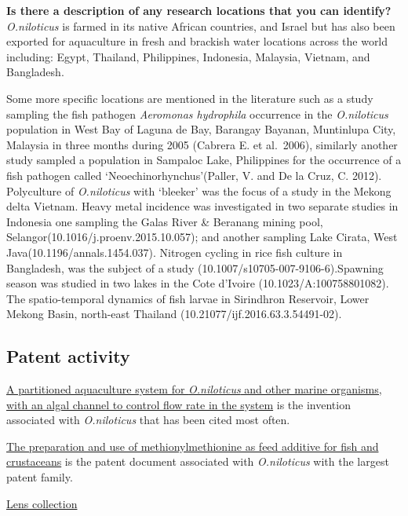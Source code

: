 \documentclass[]{book}
\theoremstyle{definition}
\theoremstyle{definition}
\theoremstyle{definition}
\theoremstyle{remark}
\begin{document}
\textbf{Is there a description of any research locations that you can
identify?}\\
\emph{O.niloticus} is farmed in its native African countries, and Israel
but has also been exported for aquaculture in fresh and brackish water
locations across the world including: Egypt, Thailand, Philippines,
Indonesia, Malaysia, Vietnam, and Bangladesh.

Some more specific locations are mentioned in the literature such as a
study sampling the fish pathogen \emph{Aeromonas hydrophila} occurrence
in the \emph{O.niloticus} population in West Bay of Laguna de Bay,
Barangay Bayanan, Muntinlupa City, Malaysia in three months during 2005
(Cabrera E. et al.~2006), similarly another study sampled a population
in Sampaloc Lake, Philippines for the occurrence of a fish pathogen
called `Neoechinorhynchus'(Paller, V. and De la Cruz, C. 2012).
Polyculture of \emph{O.niloticus} with `bleeker' was the focus of a
study in the Mekong delta Vietnam. Heavy metal incidence was
investigated in two separate studies in Indonesia one sampling the Galas
River \& Beranang mining pool, Selangor(10.1016/j.proenv.2015.10.057);
and another sampling Lake Cirata, West Java(10.1196/annals.1454.037).
Nitrogen cycling in rice fish culture in Bangladesh, was the subject of
a study (10.1007/s10705-007-9106-6).Spawning season was studied in two
lakes in the Cote d'Ivoire (10.1023/A:100758801082). The spatio-temporal
dynamics of fish larvae in Sirindhron Reservoir, Lower Mekong Basin,
north-east Thailand (10.21077/ijf.2016.63.3.54491-02).

\hypertarget{patent-activity-5}{%
\subsection{Patent activity}\label{patent-activity-5}}

\href{https://www.lens.org/lens/patent/US_6192833_B1}{A partitioned
aquaculture system for \emph{O.niloticus} and other marine organisms,
with an algal channel to control flow rate in the system} is the
invention associated with \emph{O.niloticus} that has been cited most
often.

\href{https://www.lens.org/lens/patent/US_2015_0223495_A1}{The
preparation and use of methionylmethionine as feed additive for fish and
crustaceans} is the patent document associated with \emph{O.niloticus}
with the largest patent family.

\href{https://www.lens.org/lens/collection/24913}{Lens collection}
\end{document}
